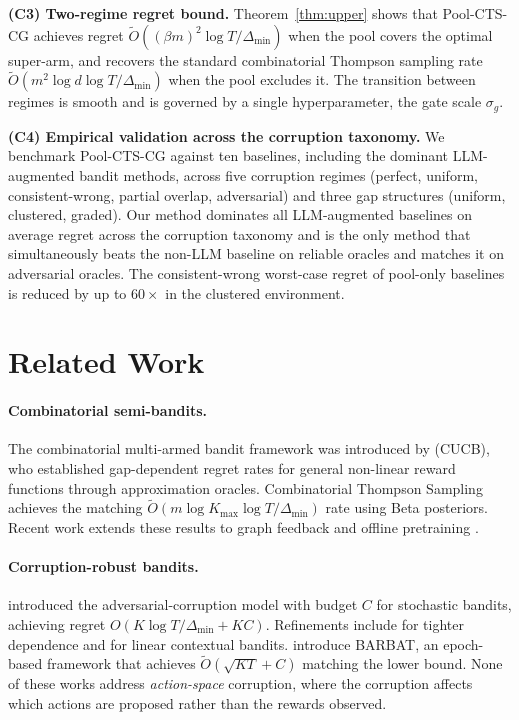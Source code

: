 \documentclass{article}
\theoremstyle{plain}
\theoremstyle{definition}
\theoremstyle{remark}
\newcommand{\gap}{\Delta_{\min}}
\newcommand{\algname}{Pool-CTS-CG}
\begin{document}
\textbf{(C3) Two-regime regret bound.} Theorem~\ref{thm:upper} shows that \algname{} achieves regret $\tilde{O}((\beta m)^2 \log T / \gap)$ when the pool covers the optimal super-arm, and recovers the standard combinatorial Thompson sampling rate $\tilde{O}(m^2 \log d \log T / \gap)$ when the pool excludes it. The transition between regimes is smooth and is governed by a single hyperparameter, the gate scale $\sigma_g$.

\textbf{(C4) Empirical validation across the corruption taxonomy.} We benchmark \algname{} against ten baselines, including the dominant LLM-augmented bandit methods, across five corruption regimes (perfect, uniform, consistent-wrong, partial overlap, adversarial) and three gap structures (uniform, clustered, graded). Our method dominates all LLM-augmented baselines on average regret across the corruption taxonomy and is the only method that simultaneously beats the non-LLM baseline on reliable oracles and matches it on adversarial oracles. The consistent-wrong worst-case regret of pool-only baselines is reduced by up to $60\times$ in the clustered environment.

\section{Related Work}
\label{sec:related}

\paragraph{Combinatorial semi-bandits.} The combinatorial multi-armed bandit framework was introduced by \citet{chen2013cucb} (CUCB), who established gap-dependent regret rates for general non-linear reward functions through approximation oracles. Combinatorial Thompson Sampling \citep{wang2018cts} achieves the matching $\tilde{O}(m \log K_{\max} \log T / \gap)$ rate using Beta posteriors. Recent work extends these results to graph feedback \citep{wen2025adversarial} and offline pretraining \citep{liu2025offcmab}.

\paragraph{Corruption-robust bandits.} \citet{lykouris2018robust} introduced the adversarial-corruption model with budget $C$ for stochastic bandits, achieving regret $O(K \log T / \gap + KC)$. Refinements include \citet{gupta2019better} for tighter dependence and \citet{he2022nearly} for linear contextual bandits. \citet{fang2025barbat} introduce BARBAT, an epoch-based framework that achieves $\tilde{O}(\sqrt{KT} + C)$ matching the lower bound. None of these works address \emph{action-space} corruption, where the corruption affects which actions are proposed rather than the rewards observed.
\end{document}
